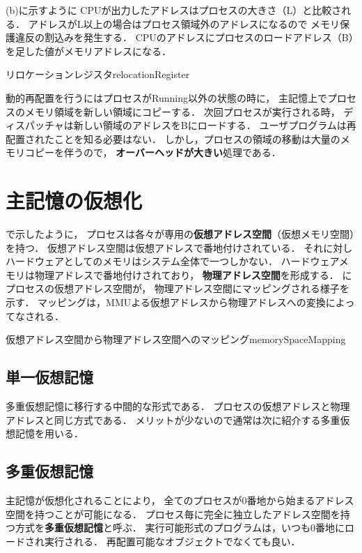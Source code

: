 (b)に示すように
CPUが出力したアドレスはプロセスの大きさ（L）と比較される．
アドレスがL以上の場合はプロセス領域外のアドレスになるので
メモリ保護違反の割込みを発生する．
CPUのアドレスにプロセスのロードアドレス（B）を足した値がメモリアドレスになる．

{リロケーションレジスタ}{relocationRegister}

動的再配置を行うにはプロセスがRunning以外の状態の時に，
主記憶上でプロセスのメモリ領域を新しい領域にコピーする．
次回プロセスが実行される時，
ディスパッチャは新しい領域のアドレスをBにロードする．
ユーザプログラムは再配置されたことを知る必要はない．
しかし，プロセスの領域の移動は大量のメモリコピーを伴うので，
{\bf オーバーヘッドが大きい}処理である．

\section{主記憶の仮想化}
で示したように，
プロセスは各々が専用の{\bf 仮想アドレス空間}（仮想メモリ空間）を持つ．
仮想アドレス空間は仮想アドレスで番地付けされている．
それに対しハードウェアとしてのメモリはシステム全体で一つしかない．
ハードウェアメモリは物理アドレスで番地付けされており，
{\bf 物理アドレス空間}を形成する．
にプロセスの仮想アドレス空間が，
物理アドレス空間にマッピングされる様子を示す．
マッピングは，MMUよる仮想アドレスから物理アドレスへの変換によってなされる．

{仮想アドレス空間から物理アドレス空間へのマッピング}{memorySpaceMapping}

\subsection{単一仮想記憶}
多重仮想記憶に移行する中間的な形式である．
プロセスの仮想アドレスと物理アドレスと同じ方式である．
メリットが少ないので通常は次に紹介する多重仮想記憶を用いる．

\subsection{多重仮想記憶}
主記憶が仮想化されることにより，
全てのプロセスが0番地から始まるアドレス空間を持つことが可能になる．
プロセス毎に完全に独立したアドレス空間を持つ方式を{\bf 多重仮想記憶}と呼ぶ．
実行可能形式のプログラムは，いつも0番地にロードされ実行される．
再配置可能なオブジェクトでなくても良い．

